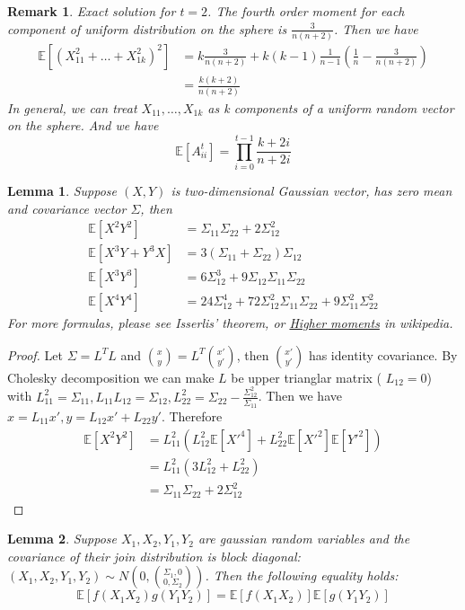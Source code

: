 \documentclass{article}
\def\E{\mathbb{E}}
\newtheorem{lemma}{Lemma}
\newtheorem{remark}{Remark}
\begin{document}
\begin{remark}
Exact solution for $t=2$. The fourth order moment for each component of uniform distribution on the sphere is $\frac{3}{n(n+2)}$. Then we have
\begin{align*}
\E[(X_{11}^2 + \dots + X_{1k}^2)^2] &= k\frac{3}{n(n+2)} + k(k-1)\frac{1}{n-1} (\frac{1}{n} - \frac{3}{n(n+2)}) \\
&=\frac{k(k+2)}{n(n+2)}
\end{align*}
In general, we can treat $X_{11}, \dots, X_{1k}$ as k components of a uniform random vector on the sphere. And we have 
\begin{equation}
\E[A_{ii}^t] = \prod_{i=0}^{t-1}\frac{k+2i}{n+2i}
\end{equation}
\end{remark}
\begin{lemma}\label{lem:x2y2}
Suppose $(X,Y)$ is two-dimensional Gaussian vector, has zero mean and covariance vector $\Sigma$, then 
\begin{align*}
\E[X^2 Y^2] &= \Sigma_{11}\Sigma_{22} + 2\Sigma_{12}^2 \\
\E[X^3 Y + Y^3 X ] &= 3 (\Sigma_{11} + \Sigma_{22}) \Sigma_{12} \\
\E[X^3 Y^3] & = 6 \Sigma_{12}^3 + 9 \Sigma_{12} \Sigma_{11} \Sigma_{22}\\
\E[X^4 Y^4] & = 24 \Sigma_{12}^4 + 72 \Sigma_{12}^2 \Sigma_{11} \Sigma_{22} + 9\Sigma_{11}^2 \Sigma_{22}^2 
\end{align*}
For more formulas, please see Isserlis' theorem, or \href{https://en.wikipedia.org/wiki/Multivariate_normal_distribution#Higher_moments}{Higher moments} in wikipedia.
\end{lemma}
\begin{proof}
Let $\Sigma = L^T L $ and $\binom{x}{y} = L^T \binom{x'}{y'}$, then $\binom{x'}{y'}$ has identity covariance. By Cholesky decomposition we can make $L$ be upper trianglar matrix (
$L_{12}=0$) with $L_{11}^2 = \Sigma_{11}, L_{11}L_{12} = \Sigma_{12}, L_{22}^2 = \Sigma_{22} - \frac{\Sigma_{12}^2}{\Sigma_{11}}$. Then we have $x = L_{11} x', y = L_{12} x' + L_{22} y'$. Therefore
\begin{align*}
\E[X^2 Y^2] & = L_{11}^2 (L_{12}^2\E[X'^4]+ L^2_{22}\E[X'^2]\E[Y'^2]) \\
& = L_{11}^2(3L_{12}^2 + L^2_{22}) \\
& = \Sigma_{11}\Sigma_{22} + 2\Sigma_{12}^2
\end{align*}
\end{proof}
\begin{lemma}\label{lem:abcd}
Suppose $X_1, X_2, Y_1, Y_2$ are gaussian random variables and the covariance of their join distribution is block diagonal:
$(X_1, X_2, Y_1, Y_2) \sim N(0, \binom{\Sigma_1, 0}{0, \Sigma_2})$. Then the following equality holds:
\begin{equation}
\E[f(X_1X_2)g(Y_1Y_2)] = \E[f(X_1 X_2)] \E[g(Y_1 Y_2)]
\end{equation}
\end{lemma}
\end{document}
